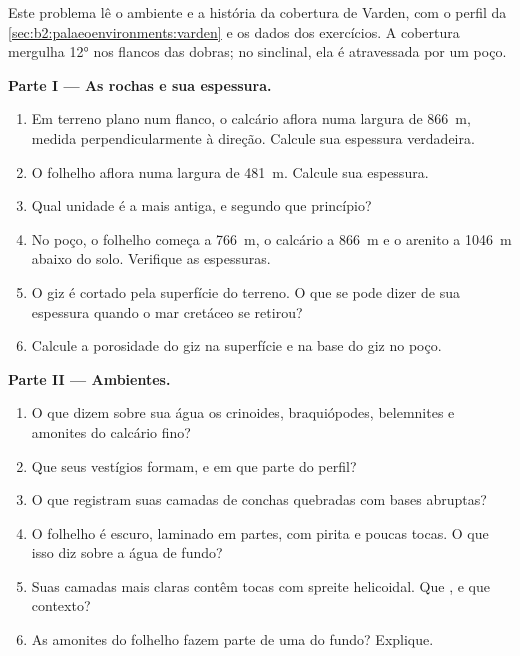 \begin{problem}\label{pb:b2:palaeoenvironments:1}
Este problema lê o ambiente e a história da cobertura de Varden, com o perfil da
\cref{sec:b2:palaeoenvironments:varden} e os dados dos exercícios. A cobertura mergulha
\ang{12} nos flancos das dobras; no sinclinal, ela é atravessada por um poço.

\medskip\noindent\textbf{Parte I --- As rochas e sua espessura.}
\begin{enumerate}
  \item Em terreno plano num flanco, o calcário aflora numa largura de \qty{866}{m}, medida
        perpendicularmente à direção. Calcule sua espessura verdadeira.
  \item O folhelho aflora numa largura de \qty{481}{m}. Calcule sua espessura.
  \item Qual unidade é a mais antiga, e segundo que princípio?
  \item No poço, o folhelho começa a \qty{766}{m}, o calcário a \qty{866}{m} e o
        arenito a \qty{1046}{m} abaixo do solo. Verifique as espessuras.
  \item O giz é cortado pela superfície do terreno. O que se pode dizer de sua espessura quando o
        mar cretáceo se retirou?
  \item Calcule a porosidade do giz na superfície e na base do giz no poço.
\end{enumerate}

\medskip\noindent\textbf{Parte II --- Ambientes.}
\begin{enumerate}[resume]
  \item O que dizem sobre sua água os crinoides, braquiópodes, belemnites e amonites do calcário
        fino?
  \item Que  seus vestígios formam, e em que parte do perfil?
  \item O que registram suas camadas de conchas quebradas com bases abruptas?
  \item O folhelho é escuro, laminado em partes, com pirita e poucas tocas. O que isso diz
        sobre a água de fundo?
  \item Suas camadas mais claras contêm tocas com spreite helicoidal. Que , e que contexto?
  \item As amonites do folhelho fazem parte de uma  do fundo? Explique.
\end{enumerate}


\end{problem}
